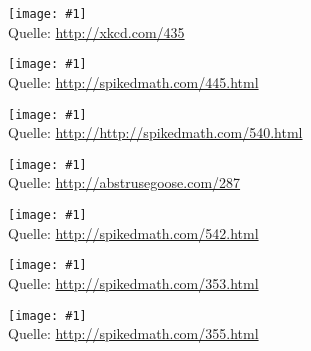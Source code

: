 \documentclass[a4paper,ngerman,landscape]{scrartcl}
\newcommand{\comic}[3]{\begin{center}
  \texttt{[image: \#1]} \\[2em]

  Quelle: \url{#2}
\end{center}\newpage}
\begin{document}
\comic{purity.png}{http://xkcd.com/435}{0.8}
\comic{three-logicians.png}{http://spikedmath.com/445.html}{1.4}
\comic{540-adventures-of-martin.png}{http://http://spikedmath.com/540.html}{1.4}
\comic{this_is_what_my_room_looks_like_when_i_draw}{http://abstrusegoose.com/287}{0.4}
\comic{542-science-vs-math}{http://spikedmath.com/542.html}{1.4}
\comic{353-fortune-teller-1}{http://spikedmath.com/353.html}{1.4}
\comic{355-fortune-teller-3}{http://spikedmath.com/355.html}{1.4}
\end{document}
